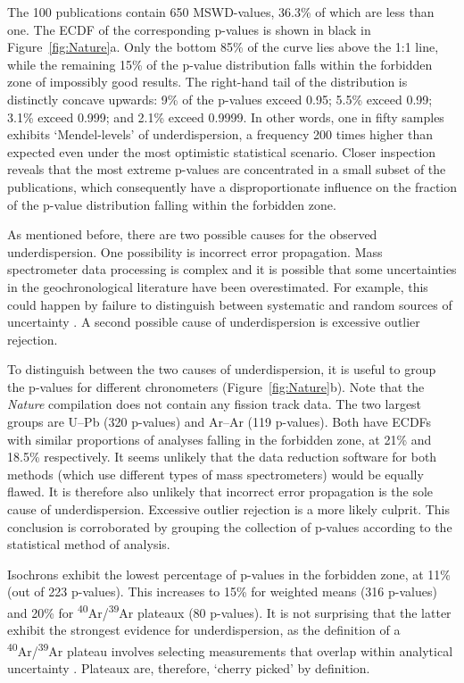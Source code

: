 \documentclass[gchron, manuscript]{copernicus}
\begin{document}
The 100 publications contain 650 MSWD-values, 36.3\% of which are less
than one. The ECDF of the corresponding p-values is shown in black in
Figure~\ref{fig:Nature}a. Only the bottom 85\% of the curve lies above
the 1:1 line, while the remaining 15\% of the p-value distribution
falls within the forbidden zone of impossibly good results. The
right-hand tail of the distribution is distinctly concave upwards: 9\%
of the p-values exceed 0.95; 5.5\% exceed 0.99; 3.1\% exceed 0.999;
and 2.1\% exceed 0.9999. In other words, one in fifty samples exhibits
`Mendel-levels' of underdispersion, a frequency 200 times higher than
expected even under the most optimistic statistical scenario. Closer
inspection reveals that the most extreme p-values are concentrated in
a small subset of the publications, which consequently have a
disproportionate influence on the fraction of the p-value distribution
falling within the forbidden zone.\medskip

As mentioned before, there are two possible causes for the observed
underdispersion.  One possibility is incorrect error propagation. Mass
spectrometer data processing is complex and it is possible that some
uncertainties in the geochronological literature have been
overestimated. For example, this could happen by failure to
distinguish between systematic and random sources of uncertainty
\citep{renne1998}.  A second possible cause of underdispersion is
excessive outlier rejection.\medskip

To distinguish between the two causes of underdispersion, it is useful
to group the p-values for different chronometers
(Figure~\ref{fig:Nature}b). Note that the \emph{Nature} compilation
does not contain any fission track data. The two largest groups are
U--Pb (320 p-values) and Ar--Ar (119 p-values).  Both have ECDFs with
similar proportions of analyses falling in the forbidden zone, at 21\%
and 18.5\% respectively. It seems unlikely that the data reduction
software for both methods (which use different types of mass
spectrometers) would be equally flawed. It is therefore also unlikely
that incorrect error propagation is the sole cause of
underdispersion. Excessive outlier rejection is a more likely
culprit. This conclusion is corroborated by grouping the collection of
p-values according to the statistical method of analysis.\medskip

Isochrons exhibit the lowest percentage of p-values in the forbidden
zone, at 11\% (out of 223 p-values).  This increases to 15\% for
weighted means (316 p-values) and 20\% for
\textsuperscript{40}Ar/\textsuperscript{39}Ar plateaux (80 p-values).
It is not surprising that the latter exhibit the strongest evidence
for underdispersion, as the definition of a
\textsuperscript{40}Ar/\textsuperscript{39}Ar plateau involves
selecting measurements that overlap within analytical uncertainty
\citep{dalrymple1969,jourdan2009}. Plateaux are, therefore, `cherry
picked' by definition.\medskip
\end{document}
